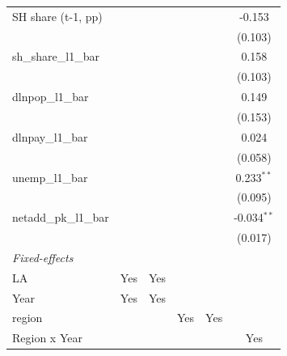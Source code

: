 \begin{table}[htbp]
\begin{tabular}{lccccc}
      SH share (t-1, pp)                         &               &              &                &                & -0.153\\   
                                                 &               &              &                &                & (0.103)\\   
      sh\_share\_l1\_bar                         &               &              &                &                & 0.158\\   
                                                 &               &              &                &                & (0.103)\\   
      dlnpop\_l1\_bar                            &               &              &                &                & 0.149\\   
                                                 &               &              &                &                & (0.153)\\   
      dlnpay\_l1\_bar                            &               &              &                &                & 0.024\\   
                                                 &               &              &                &                & (0.058)\\   
      unemp\_l1\_bar                             &               &              &                &                & 0.233$^{**}$\\   
                                                 &               &              &                &                & (0.095)\\   
      netadd\_pk\_l1\_bar                        &               &              &                &                & -0.034$^{**}$\\   
                                                 &               &              &                &                & (0.017)\\   
      \midrule
      \emph{Fixed-effects}\\
      LA                                         & Yes           & Yes          &                &                & \\  
      Year                                       & Yes           & Yes          &                &                & \\  
      region                                     &               &              & Yes            & Yes            & \\  
      Region x Year                              &               &              &                &                & Yes\\  

\end{tabular}
\end{table}
